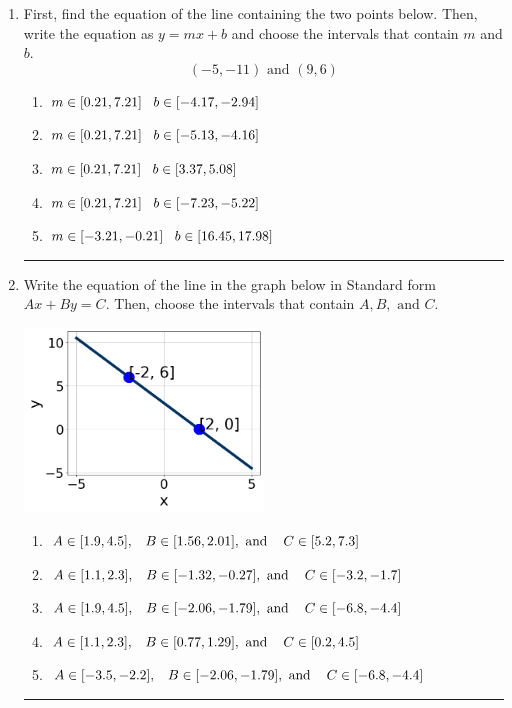 \documentclass[14pt]{extbook}
\newcommand{\litem}[1]{\item#1\hspace*{-1cm}\rule{\textwidth}{0.4pt}}
\begin{document}
\begin{enumerate}
{\begin{enumerate}[label=\Alph*.]
\end{enumerate} }
\litem{
First, find the equation of the line containing the two points below. Then, write the equation as $ y=mx+b $ and choose the intervals that contain $m$ and $b$.\[ (-5, -11) \text{ and } (9, 6) \]\begin{enumerate}[label=\Alph*.]
\item \( m \in [0.21, 7.21] \hspace*{3mm} b \in [-4.17, -2.94] \)
\item \( m \in [0.21, 7.21] \hspace*{3mm} b \in [-5.13, -4.16] \)
\item \( m \in [0.21, 7.21] \hspace*{3mm} b \in [3.37, 5.08] \)
\item \( m \in [0.21, 7.21] \hspace*{3mm} b \in [-7.23, -5.22] \)
\item \( m \in [-3.21, -0.21] \hspace*{3mm} b \in [16.45, 17.98] \)

\end{enumerate} }
\litem{
Write the equation of the line in the graph below in Standard form $Ax+By=C$. Then, choose the intervals that contain $A, B, \text{ and } C$.
\begin{center}
    \includegraphics[width=0.5\textwidth]{../Figures/linearGraphToStandardCopyC.png}
\end{center}
\begin{enumerate}[label=\Alph*.]
\item \( A \in [1.9, 4.5], \hspace{3mm} B \in [1.56, 2.01], \text{ and } \hspace{3mm} C \in [5.2, 7.3] \)
\item \( A \in [1.1, 2.3], \hspace{3mm} B \in [-1.32, -0.27], \text{ and } \hspace{3mm} C \in [-3.2, -1.7] \)
\item \( A \in [1.9, 4.5], \hspace{3mm} B \in [-2.06, -1.79], \text{ and } \hspace{3mm} C \in [-6.8, -4.4] \)
\item \( A \in [1.1, 2.3], \hspace{3mm} B \in [0.77, 1.29], \text{ and } \hspace{3mm} C \in [0.2, 4.5] \)
\item \( A \in [-3.5, -2.2], \hspace{3mm} B \in [-2.06, -1.79], \text{ and } \hspace{3mm} C \in [-6.8, -4.4] \)


\end{enumerate}}
\end{enumerate}
\end{document}
